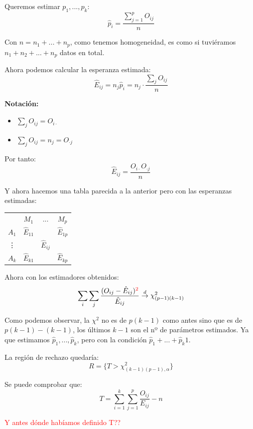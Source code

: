 \documentclass[nochap]{apuntes}
\begin{document}
Queremos estimar $p_1,...,p_k$:
$$\hat{p}_i=\frac{\sum_{j=1}^p O_{ij}}{n}$$

Con $n=n_1+...+n_p$, como tenemos homogeneidad, es como si tuviéramos $n_1+n_2+...+n_p$ datos en total. 

Ahora podemos calcular la esperanza estimada:
$$\hat{E}_{ij} = n_j \hat{p}_i=n_j \cdot \frac{\sum_j O_{ij}}{n}$$

\textbf{Notación:} 
\begin{itemize}
\item $\sum_j O_{ij} = O_{i\cdot}$
\item $\sum_j O_{ij} = n_j =  O_{\cdot j}$
\end{itemize}
Por tanto:
$$\hat{E}_{ij} = \frac{O_{i\cdot} O_{\cdot j}}{n}$$

Y ahora hacemos una tabla parecida a la anterior pero con las esperanzas estimadas:

\begin{tabular}{cccc}
& $M_1$ & ... & $M_p$ \\
$A_1$ & $\hat{E}_{11}$ &  & $\hat{E}_{1p}$ \\
\vdots &  & $\hat{E}_{ij}$ &  \\
$A_k$ & $\hat{E}_{k1}$ &  & $\hat{E}_{kp}$ \\
\end{tabular}

Ahora con los estimadores obtenidos:
$$ \sum_i \sum_j \frac{(O_{ij}-\hat{E}_{ij})^{\textcolor{red}{2}}}{\hat{E}_{ij}} \stackrel{d}{\rightarrow} \chi^2_{(p-1)(k-1)} $$

Como podemos observar, la $\chi^2$ no es de $p(k-1)$ como antes sino que es de $p(k-1)-(k-1)$, los últimos $k-1$ son el nº de parámetros estimados. Ya que estimamos $\hat{p}_1,...,\hat{p}_k$, pero con la condición $\hat{p}_1+...+\hat{p}_k  1$.

La región de rechazo quedaría:
$$ R=\{T > \chi^2_{(k-1)(p-1),\alpha}\}$$

\begin{obs}
Se puede comprobar que:
$$ T = \sum_{i=1}^k \sum_{j=1}^p \frac{O_{ij}}{E_{ij}}-n$$

\textcolor{red}{Y antes dónde habíamos definido T??}
\end{obs}
\end{document}
